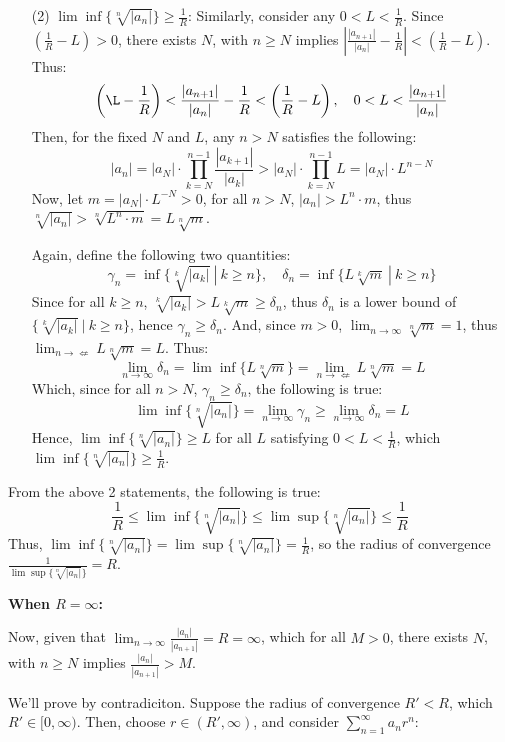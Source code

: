 \documentclass{article}
\begin{document}
\begin{itemize}
    \hfill

    \item[(2)] $\lim\inf\{\sqrt[n]{|a_n|}\}\geq \frac{1}{R}$: Similarly, consider any $0<L<\frac{1}{R}$. Since $(\frac{1}{R}-L)>0$, there exists $N$, with $n\geq N$ implies $\left|\frac{|a_{n+1}|}{|a_n|}-\frac{1}{R}\right|<(\frac{1}{R}-L)$. Thus:
    $$\left(\L-\frac{1}{R}\right)<\frac{|a_{n+1}|}{|a_n|}-\frac{1}{R}<\left(\frac{1}{R}-L\right),\quad 0<L<\frac{|a_{n+1}|}{|a_n|}$$
    Then, for the fixed $N$ and $L$, any $n>N$ satisfies the following:
    $$|a_n|=|a_N|\cdot\prod_{k=N}^{n-1}\frac{|a_{k+1}|}{|a_k|} > |a_N|\cdot\prod_{k=N}^{n-1}L = |a_N|\cdot L^{n-N}$$
    Now, let $m=|a_N|\cdot L^{-N}>0$, for all $n>N$, $|a_n|>L^n\cdot m$, thus $\sqrt[n]{|a_n|}>\sqrt[n]{L^n\cdot m} = L\sqrt[n]{m}$.

    Again, define the following two quantities:
    $$\gamma_n=\inf\{\sqrt[k]{|a_k|}\ |\ k\geq n\},\quad \delta_n = \inf\{L\sqrt[k]{m}\ |\ k\geq n\}$$
    Since for all $k\geq n$, $\sqrt[k]{|a_k|}>L\sqrt[k]{m} \geq \delta_n$, thus $\delta_n$ is a lower bound of $\{\sqrt[k]{|a_k|}\ |\ k\geq n\}$, hence $\gamma_n \geq \delta_n$.
    And, since $m>0$, $\lim_{n\rightarrow\infty}\sqrt[n]{m}=1$, thus $\lim_{n\rightarrow\nLeftarrow}L\sqrt[n]{m}=L$. Thus:
    $$\lim_{n\rightarrow\infty}\delta_n = \lim\inf\{L\sqrt[n]{m}\} =\lim_{n\rightarrow\nLeftarrow}L\sqrt[n]{m}=L$$
    Which, since for all $n>N$, $\gamma_n\geq \delta_n$, the following is true:
    $$\lim\inf\{\sqrt[n]{|a_n|}\}=\lim_{n\rightarrow\infty}\gamma_n \geq \lim_{n\rightarrow\infty}\delta_n=L$$
    Hence, $\lim\inf\{\sqrt[n]{|a_n|}\}\geq L$ for all $L$ satisfying $0<L<\frac{1}{R}$, which $\lim\inf\{\sqrt[n]{|a_n|}\}\geq \frac{1}{R}$.
\end{itemize}

From the above 2 statements, the following is true:
$$\frac{1}{R}\leq\lim\inf\{\sqrt[n]{|a_n|}\}\leq \lim\sup\{\sqrt[n]{|a_n|}\}\leq \frac{1}{R}$$
Thus, $\lim\inf\{\sqrt[n]{|a_n|}\}= \lim\sup\{\sqrt[n]{|a_n|}\}=\frac{1}{R}$, so the radius of convergence $\frac{1}{\lim\sup\{\sqrt[n]{|a_n|}\}}=R$.

\hfill

\hfill

\textbf{When $R=\infty$:}

Now, given that $\lim_{n\rightarrow\infty}\frac{|a_{n}|}{|a_{n+1}|}=R=\infty$, which for all $M>0$, there exists $N$, with $n\geq N$ implies $\frac{|a_n|}{|a_{n+1}|}>M$.

\hfill

We'll prove by contradiciton. Suppose the radius of convergence $R'<R$, which $R'\in[0,\infty)$. 
Then, choose $r\in(R',\infty)$, and consider $\sum_{n=1}^{\infty}a_nr^n$:
\end{document}
